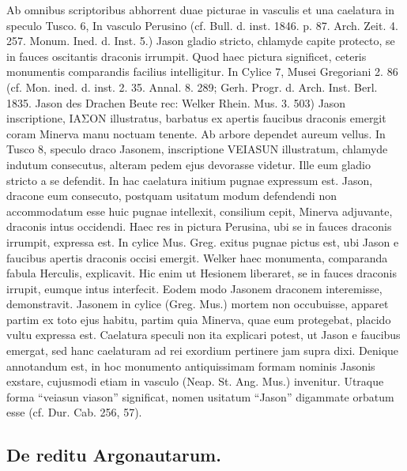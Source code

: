 \documentclass[landscape, a4paper, 11pt, oneside, polutonikogreek, german]{article}
\begin{document}
Ab omnibus scriptoribus abhorrent duae picturae in vasculis et una caelatura in speculo Tusco. 6, In vasculo Perusino (cf. Bull. d. inst. 1846. p. 87. Arch. Zeit. 4. 257. Monum. Ined. d. Inst. 5.) Jason gladio stricto, chlamyde capite protecto, se in fauces oscitantis draconis irrumpit. Quod haec pictura significet, ceteris monumentis comparandis facilius intelligitur. In Cylice 7, Musei Gregoriani 2. 86 (cf. Mon. ined. d. inst. 2. 35. Annal. 8. 289; Gerh. Progr. d. Arch. Inst. Berl. 1835. Jason des Drachen Beute rec: Welker Rhein. Mus. 3. 503) Jason inscriptione, ΙΑΣΟΝ illustratus, barbatus ex apertis faucibus draconis emergit coram Minerva manu noctuam tenente. Ab arbore dependet aureum vellus. In Tusco 8, speculo draco Jasonem, inscriptione VEIASUN illustratum, chlamyde indutum consecutus, alteram pedem ejus devorasse videtur. Ille eum gladio stricto a se defendit. In hac caelatura initium pugnae expressum est. Jason, dracone eum consecuto, postquam usitatum modum defendendi non accommodatum esse huic pugnae intellexit, consilium cepit, Minerva adjuvante, draconis intus occidendi. Haec res in pictura Perusina, ubi se in fauces draconis irrumpit, expressa est. In cylice Mus. Greg. exitus pugnae pictus est, ubi Jason e faucibus apertis draconis occisi emergit. Welker haec monumenta, comparanda fabula Herculis, explicavit. Hic enim ut Hesionem liberaret, se in fauces draconis irrupit, eumque intus interfecit. Eodem modo Jasonem draconem interemisse, demonstravit. Jasonem in cylice (Greg. Mus.) mortem non occubuisse, apparet partim ex toto ejus habitu, partim quia Minerva, quae eum protegebat, placido vultu expressa est. Caelatura speculi non ita explicari potest, ut Jason e faucibus emergat, sed hanc caelaturam ad rei exordium pertinere jam supra dixi. Denique annotandum est, in hoc monumento antiquissimam formam nominis Jasonis exstare, cujusmodi etiam in vasculo (Neap. St. Ang. Mus.) invenitur. Utraque forma "`veiasun viason"' significat, nomen usitatum "`Jason"' digammate orbatum esse (cf. Dur. Cab. 256, 57).

\subsection{De reditu Argonautarum.}
\end{document}
